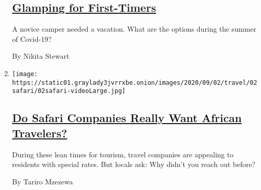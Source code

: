 \begin{enumerate}
{  \subsection{\texorpdfstring{\href{/2020/09/03/travel/virus-glamping.html}{Glamping
  for
  First-Timers}}{Glamping for First-Timers}}\label{glamping-for-first-timers}}

  A novice camper needed a vacation. What are the options during the
  summer of Covid-19?

  By Nikita Stewart
\item
  \texttt{[image: https://static01.graylady3jvrrxbe.onion/images/2020/09/02/travel/02safari/02safari-videoLarge.jpg]}

  \hypertarget{do-safari-companies-really-want-african-travelers}{%
  \subsection{\texorpdfstring{\href{/2020/09/02/travel/Africa-safaris-local-tourism-coronavirus.html}{Do
  Safari Companies Really Want African
  Travelers?}}{Do Safari Companies Really Want African Travelers?}}\label{do-safari-companies-really-want-african-travelers}}

  During these lean times for tourism, travel companies are appealing to
  residents with special rates. But locals ask: Why didn't you reach out
  before?

  By Tariro Mzezewa
\end{enumerate}

